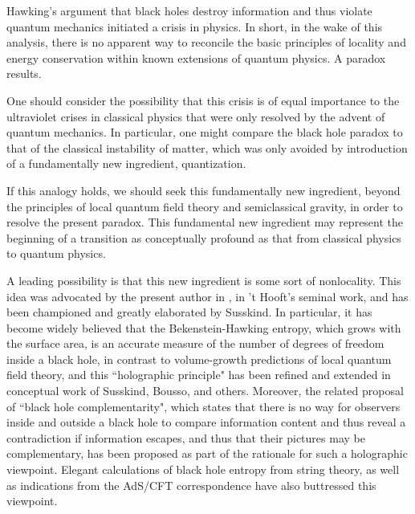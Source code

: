 \Date{}


Hawking's argument that black holes destroy information  and thus violate quantum mechanics initiated a crisis  in physics.  In short, in the wake of this analysis, there is no apparent way to reconcile 
the basic principles of locality and energy conservation within known extensions of quantum physics.  A paradox results.

One should consider the possibility that this crisis is of equal importance  to the ultraviolet crises in classical physics that were only resolved by the advent of quantum mechanics.  In particular, one might compare the black hole paradox to that of the classical instability of matter, which was only avoided by introduction of a fundamentally new ingredient,  quantization.

If this analogy holds, we should seek this fundamentally new ingredient, beyond the principles of local quantum field theory and semiclassical gravity, in order to resolve the present paradox.  This fundamental new ingredient may represent the beginning of a transition as conceptually profound as that from classical physics to quantum physics.

A leading possibility is that this new ingredient is some sort of nonlocality.   This idea was advocated by the present author in , in 't Hooft's seminal work,  and has been
championed and greatly elaborated by Susskind\Sussholo.  In particular, it has become widely believed that the Bekenstein-Hawking entropy, which grows with the surface area, is an accurate measure of the number of degrees of freedom inside a black hole, in contrast to volume-growth predictions of local quantum field theory, and this  ``holographic principle" has been refined and extended in conceptual work of Susskind, Bousso, and others.  Moreover, the related proposal of  ``black hole complementarity", which states that there is no way for observers inside and outside a black hole to compare information content and thus reveal a contradiction if information escapes, and thus that their pictures may be complementary, has been proposed as part of the rationale for such a holographic viewpoint.  Elegant calculations of black hole entropy from string theory, as well as indications from the AdS/CFT correspondence have also buttressed this viewpoint.

